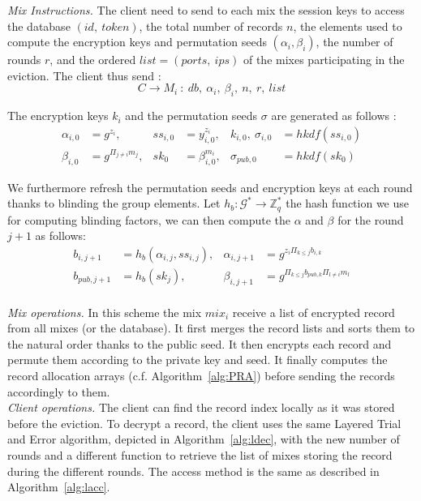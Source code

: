 \documentclass{llncs}
\begin{document}
\noindent\textit{Mix Instructions.}
The client need to send to each mix the session keys to access the database $(id,\ token)$, the total number of records $n$, the elements used to compute the encryption keys and permutation seeds $(\alpha_i, \beta_i)$, the number of rounds $r$, and the ordered $list=(ports,\ ips)$ of the mixes participating in the eviction. The client thus send :
$$C \rightarrow M_i\ :\ db,\ \alpha_i,\ \beta_{i},\ n,\ r,\ list$$

\noindent The encryption keys $k_i$ and the permutation seeds $\sigma$ are generated as follows :
\begin{align*}
\alpha_{i,0} &= g^{z_i}, &ss_{i,0 }&= y_{i,0}^{z_i}, &k_{i,0},\ \sigma_{i,0}&=hkdf(ss_{i,0})\\
\beta_{i, 0} &= g^{\Pi_{j\neq i}m_j}, &sk_0 &= \beta_{i,0}^{m_i}, &\sigma_{pub, 0}&=hkdf( sk_0)
\end{align*}

We furthermore refresh the permutation seeds and encryption keys at each round thanks to blinding the group elements. Let $h_b : \mathcal{G}^* \rightarrow \mathbb{Z}_{q}^*$ the hash function we use for computing blinding factors, we can then compute the $\alpha$ and $\beta$ for the round $j+1$ as follows:
\begin{align*}
b_{i,j+1}&=h_b(\alpha_{i,j}, ss_{i,j}), & \alpha_{i,j+1} &= g^{z_i\Pi_{k\leq j}b_{i,k}}\\
b_{pub,j+1}&=h_b(sk_{j}), &\beta_{i, j+1} &= g^{\Pi_{k\leq j}b_{pub,k}\Pi_{l\neq i}m_l}\\
\end{align*}

\noindent\textit{Mix operations.} In this scheme the mix $mix_i$ receive a list of encrypted record from all mixes (or the database). It first merges the record lists and  sorts them to the natural order thanks to the public seed. It then encrypts each record and permute them according to the private key and seed. It finally computes the record allocation arrays (c.f. Algorithm~\ref{alg:PRA}) before sending the records accordingly to them.\\

\noindent\textit{Client operations.} The client can find the record index locally as it was stored before the eviction. To decrypt a record, the client uses the same Layered Trial and Error algorithm, depicted in Algorithm~\ref{alg:ldec}, with the new number of rounds and a different function to retrieve the list of mixes storing the record during the different rounds.
The access method is the same as described in Algorithm~\ref{alg:lacc}. \\
\end{document}
